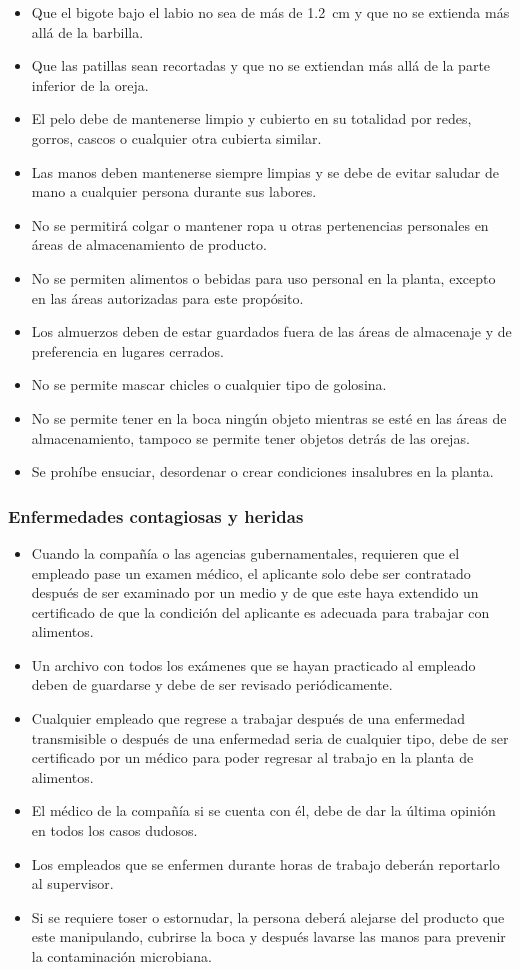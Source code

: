 \begin{itemize}
	\item Que el bigote bajo el labio no sea de más de \SI{1.2}{\centi\meter} y que no se extienda más allá de la barbilla.
	\item Que las patillas sean recortadas y que no se extiendan más allá de la parte inferior de la oreja.
	\item El pelo debe de mantenerse limpio y cubierto en su totalidad por redes, gorros, cascos o cualquier otra cubierta similar.
	\item Las manos deben mantenerse siempre limpias y se debe de evitar saludar de mano a cualquier persona durante sus labores.
	\item No se permitirá colgar o mantener ropa u otras pertenencias personales en áreas de almacenamiento de producto.
	\item No se permiten alimentos o bebidas para uso personal en la planta, excepto en las áreas autorizadas para este propósito.
	\item Los almuerzos deben de estar guardados fuera de las áreas de almacenaje y de preferencia en lugares cerrados.
	\item No se permite mascar chicles o cualquier tipo de golosina.
	\item No se permite tener en la boca ningún objeto mientras se esté en las áreas de almacenamiento, tampoco se permite tener objetos detrás de las orejas.
	\item Se prohíbe ensuciar, desordenar o crear condiciones insalubres en la planta.
\end{itemize}

\subsubsection{Enfermedades contagiosas y heridas}

\begin{itemize}
	\item Cuando la compañía o las agencias gubernamentales, requieren que el empleado pase un examen médico, el aplicante solo debe ser contratado después de ser examinado por un medio y de que este haya extendido un certificado de que la condición del aplicante es adecuada para trabajar con alimentos.
	\item Un archivo con todos los exámenes que se hayan practicado al empleado deben de guardarse y debe de ser revisado periódicamente.
	\item Cualquier empleado que regrese a trabajar después de una enfermedad transmisible o después de una enfermedad seria de cualquier tipo, debe de ser certificado por un médico para poder regresar al trabajo en la planta de alimentos.
	\item El médico de la compañía si se cuenta con él, debe de dar la última opinión en todos los casos dudosos.
	\item Los empleados que se enfermen durante horas de trabajo deberán reportarlo al supervisor.
	\item Si se requiere toser o estornudar, la persona deberá alejarse del producto que este manipulando, cubrirse la boca y después lavarse las manos para prevenir la contaminación microbiana.
\end{itemize}

